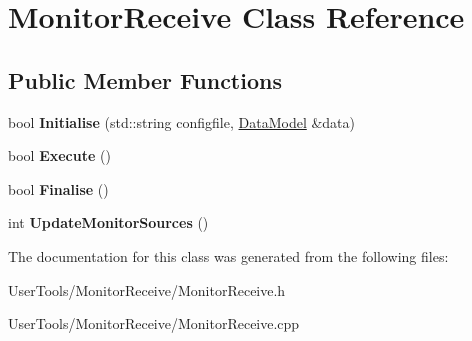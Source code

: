 \hypertarget{classMonitorReceive}{
\section{MonitorReceive Class Reference}
\label{classMonitorReceive}
}
\subsection*{Public Member Functions}
\begin{DoxyCompactItemize}
\item 
\hypertarget{classMonitorReceive_a635e0cf91b53352483bb0f30a27c1287}{
bool {\bfseries Initialise} (std::string configfile, \hyperlink{classDataModel}{DataModel} \&data)}
\label{classMonitorReceive_a635e0cf91b53352483bb0f30a27c1287}

\item 
\hypertarget{classMonitorReceive_a316f1f7d2a21f698faa0cb8d0583c49a}{
bool {\bfseries Execute} ()}
\label{classMonitorReceive_a316f1f7d2a21f698faa0cb8d0583c49a}

\item 
\hypertarget{classMonitorReceive_a9f11f11200f7cca1cffc38d9021f831a}{
bool {\bfseries Finalise} ()}
\label{classMonitorReceive_a9f11f11200f7cca1cffc38d9021f831a}

\item 
\hypertarget{classMonitorReceive_a87daa52032531a34d499d4ca510a5627}{
int {\bfseries UpdateMonitorSources} ()}
\label{classMonitorReceive_a87daa52032531a34d499d4ca510a5627}

\end{DoxyCompactItemize}


The documentation for this class was generated from the following files:\begin{DoxyCompactItemize}
\item 
UserTools/MonitorReceive/MonitorReceive.h\item 
UserTools/MonitorReceive/MonitorReceive.cpp\end{DoxyCompactItemize}
